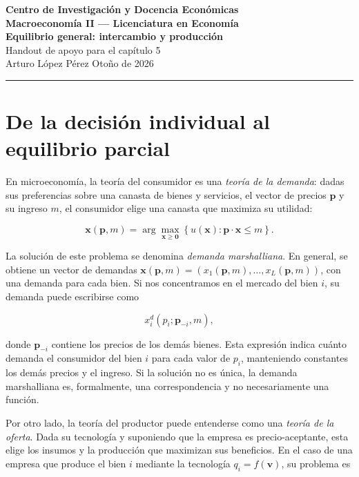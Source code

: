 \documentclass[12pt]{article}
\theoremstyle{cideplain}
\theoremstyle{cidedef}
\newcommand{\p}{\mathbf{p}}
\newcommand{\x}{\mathbf{x}}
\begin{document}

\begin{center}
  {\large\bfseries Centro de Investigación y Docencia Económicas}\\[0.25em]
  {\large\bfseries Macroeconomía II --- Licenciatura en Economía}\\[0.8em]
  {\LARGE\bfseries\color{cideblue} Equilibrio general: intercambio y producción}\\[0.8em]
  {\large Handout de apoyo para el capítulo 5}\\[0.8em]
  Arturo López Pérez \hfill Otoño de 2026
\end{center}

\vspace{0.5em}
\hrule
\vspace{0.8em}

\section{De la decisión individual al equilibrio parcial}

En microeconomía, la teoría del consumidor es una \textit{teoría de la demanda}: dadas sus preferencias sobre una canasta de bienes y servicios, el vector de precios $\p$ y su ingreso $m$, el consumidor elige una canasta que maximiza su utilidad:

\[
\x(\p,m)
=
\arg\max_{\x\geq \bm 0}
\left\{
u(\x):
\p\cdot\x\leq m
\right\}.
\]

La solución de este problema se denomina \textit{demanda marshalliana}.
En general, se obtiene un vector de demandas
$\bm x(\bm p,m)=(x_1(\bm p,m),\ldots,x_L(\bm p,m))$, con una demanda para
cada bien. Si nos concentramos en el mercado del bien $i$, su demanda
puede escribirse como

\[
x_i^d(p_i;\bm p_{-i},m),
\]

donde $\bm p_{-i}$ contiene los precios de los demás bienes. Esta
expresión indica cuánto demanda el consumidor del bien $i$ para cada
valor de $p_i$, manteniendo constantes los demás precios y el ingreso.
Si la solución no es única, la demanda marshalliana es, formalmente, una
correspondencia y no necesariamente una función.

Por otro lado, la teoría del productor puede entenderse como una
\textit{teoría de la oferta}. Dada su tecnología y suponiendo que la
empresa es precio-aceptante, esta elige los insumos y la producción que
maximizan sus beneficios. En el caso de una empresa que produce el bien
$i$ mediante la tecnología $q_i=f(\bm v)$, su problema es
\end{document}
